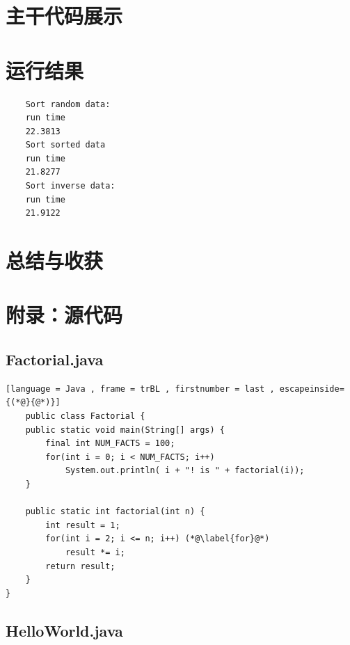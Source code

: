 \documentclass[UTF8]{ctexart}
\begin{document}
\section{主干代码展示}
\section{运行结果}
\begin{verbatim}
    Sort random data:
    run time
    22.3813
    Sort sorted data
    run time
    21.8277
    Sort inverse data:
    run time
    21.9122
\end{verbatim}
\section{总结与收获}
\newpage
\appendix
\section{附录：源代码}
\subsection{Factorial.java}
\begin{lstlisting}[language = Java , frame = trBL , firstnumber = last , escapeinside={(*@}{@*)}]
    public class Factorial {
    public static void main(String[] args) {   
        final int NUM_FACTS = 100;
        for(int i = 0; i < NUM_FACTS; i++)
            System.out.println( i + "! is " + factorial(i));
    }

    public static int factorial(int n) {
        int result = 1;
        for(int i = 2; i <= n; i++) (*@\label{for}@*)
            result *= i;
        return result;
    }
}
\end{lstlisting}
\subsection{HelloWorld.java}

\end{document}
